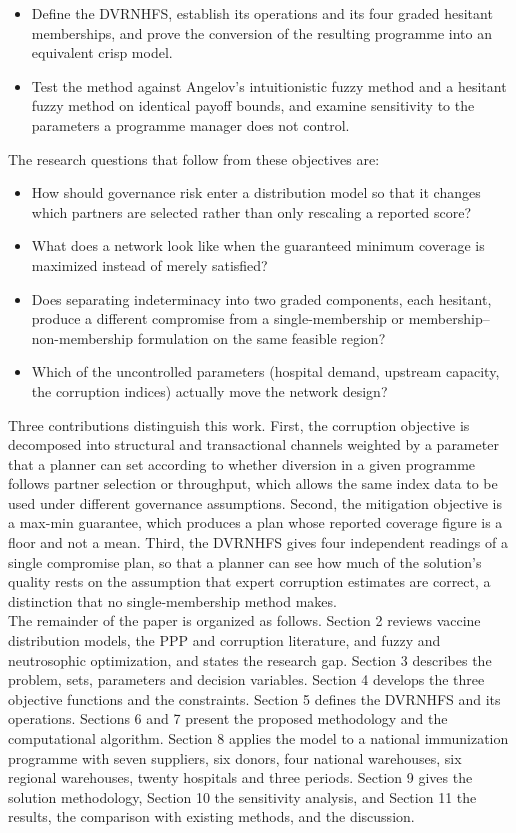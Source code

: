 \documentclass[a4paper]{elsarticle}
\begin{document}
{\begin{itemize}
    \item Define the DVRNHFS, establish its operations and its four graded hesitant memberships, and prove the conversion of the resulting programme into an equivalent crisp model.
    \item Test the method against Angelov's intuitionistic fuzzy method and a hesitant fuzzy method on identical payoff bounds, and examine sensitivity to the parameters a programme manager does not control.
\end{itemize}
The research questions that follow from these objectives are:
\begin{itemize}
\item How should governance risk enter a distribution model so that it changes which partners are selected rather than only rescaling a reported score?
\item What does a network look like when the guaranteed minimum coverage is maximized instead of merely satisfied?
\item Does separating indeterminacy into two graded components, each hesitant, produce a different compromise from a single-membership or membership--non-membership formulation on the same feasible region?
\item Which of the uncontrolled parameters (hospital demand, upstream capacity, the corruption indices) actually move the network design?
\end{itemize}
Three contributions distinguish this work. First, the corruption objective is decomposed into structural and transactional channels weighted by a parameter that a planner can set according to whether diversion in a given programme follows partner selection or throughput, which allows the same index data to be used under different governance assumptions. Second, the mitigation objective is a max-min guarantee, which produces a plan whose reported coverage figure is a floor and not a mean. Third, the DVRNHFS gives four independent readings of a single compromise plan, so that a planner can see how much of the solution's quality rests on the assumption that expert corruption estimates are correct, a distinction that no single-membership method makes.\\
The remainder of the paper is organized as follows. Section 2 reviews vaccine distribution models, the PPP and corruption literature, and fuzzy and neutrosophic optimization, and states the research gap. Section 3 describes the problem, sets, parameters and decision variables. Section 4 develops the three objective functions and the constraints. Section 5 defines the DVRNHFS and its operations. Sections 6 and 7 present the proposed methodology and the computational algorithm. Section 8 applies the model to a national immunization programme with seven suppliers, six donors, four national warehouses, six regional warehouses, twenty hospitals and three periods. Section 9 gives the solution methodology, Section 10 the sensitivity analysis, and Section 11 the results, the comparison with existing methods, and the discussion.
}
\end{document}
